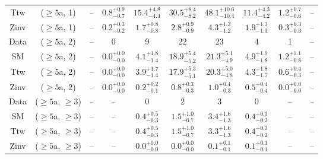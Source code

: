 \begin{table}[h!]
{\begin{tabular}{cccccccccc}
	Ttw & ($\ge5$a, 1) & -- & $0.8^{+ 0.9 }_{- 0.7 }$ & $15.4^{+ 4.8 }_{- 4.4 }$ & $30.5^{+ 8.4 }_{- 8.2 }$ & $48.1^{+ 10.6 }_{- 10.4 }$ & $11.4^{+ 4.3 }_{- 4.2 }$ & $1.2^{+ 0.7 }_{- 0.6 }$ & -- \\[0.5ex] 
	Zinv & ($\ge5$a, 1) & -- & $0.2^{+ 0.3 }_{- 0.2 }$ & $1.7^{+ 0.8 }_{- 0.8 }$ & $2.8^{+ 0.9 }_{- 0.9 }$ & $4.3^{+ 1.2 }_{- 1.2 }$ & $1.9^{+ 1.3 }_{- 1.3 }$ & $0.3^{+ 0.3 }_{- 0.3 }$ & -- \\[0.5ex] 
	Data & ($\ge5$a, 2) & -- & 0 & 9 & 22 & 23 & 4 & 1 & -- \\[0.5ex] 
	SM & ($\ge5$a, 2) & -- & $0.0^{+ 0.0 }_{- 0.0 }$ & $4.1^{+ 1.8 }_{- 1.4 }$ & $18.9^{+ 5.4 }_{- 5.2 }$ & $21.3^{+ 5.1 }_{- 4.9 }$ & $4.9^{+ 1.9 }_{- 1.8 }$ & $1.2^{+ 1.1 }_{- 0.8 }$ & -- \\[0.5ex] 
	Ttw & ($\ge5$a, 2) & -- & $0.0^{+ 0.0 }_{- 0.0 }$ & $3.9^{+ 1.7 }_{- 1.4 }$ & $17.9^{+ 5.3 }_{- 5.1 }$ & $20.3^{+ 5.0 }_{- 4.8 }$ & $4.3^{+ 1.8 }_{- 1.7 }$ & $0.6^{+ 0.4 }_{- 0.3 }$ & -- \\[0.5ex] 
	Zinv & ($\ge5$a, 2) & -- & $0.0^{+ 0.0 }_{- 0.0 }$ & $0.2^{+ 0.2 }_{- 0.1 }$ & $0.8^{+ 0.3 }_{- 0.3 }$ & $1.0^{+ 0.4 }_{- 0.3 }$ & $0.5^{+ 0.4 }_{- 0.4 }$ & $0.0^{+ 0.0 }_{- 0.0 }$ & -- \\[0.5ex] 
	Data & ($\ge5$a, $\ge3$) & -- & -- & 0 & 2 & 3 & 0 & -- & -- \\[0.5ex] 
	SM & ($\ge5$a, $\ge3$) & -- & -- & $0.4^{+ 0.5 }_{- 0.3 }$ & $1.5^{+ 1.0 }_{- 0.7 }$ & $3.4^{+ 1.6 }_{- 1.3 }$ & $0.4^{+ 0.3 }_{- 0.2 }$ & -- & -- \\[0.5ex] 
	Ttw & ($\ge5$a, $\ge3$) & -- & -- & $0.4^{+ 0.5 }_{- 0.3 }$ & $1.5^{+ 1.0 }_{- 0.7 }$ & $3.3^{+ 1.6 }_{- 1.3 }$ & $0.4^{+ 0.3 }_{- 0.2 }$ & -- & -- \\[0.5ex] 
	Zinv & ($\ge5$a, $\ge3$) & -- & -- & $0.0^{+ 0.0 }_{- 0.0 }$ & $0.0^{+ 0.0 }_{- 0.0 }$ & $0.1^{+ 0.1 }_{- 0.1 }$ & $0.1^{+ 0.1 }_{- 0.1 }$ & -- & -- \\[0.5ex] 
	\hline
	\hline
\end{tabular}}
\end{table}
